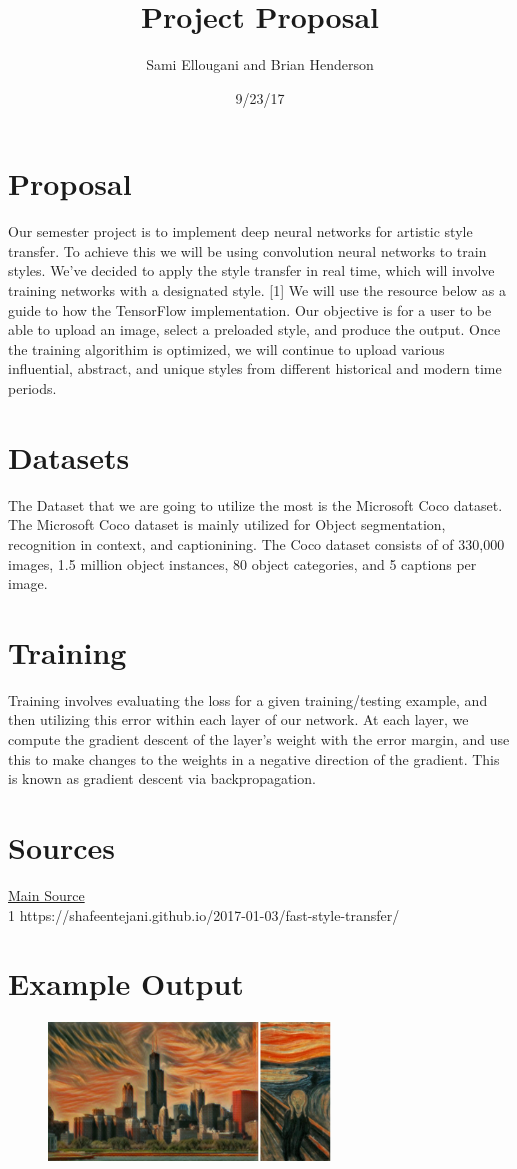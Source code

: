 \documentclass[a4paper]{article}
\title{Project Proposal}
\author{Sami Ellougani and Brian Henderson}
\date{9/23/17}
\begin{document}
\lstset{language=Python}

\maketitle

\section{Proposal}
Our semester project is to implement deep neural networks for artistic style transfer. To achieve this we will be using convolution neural networks to
train styles. We've decided to apply the style transfer in real time, which will involve training networks with a designated style. [1] We will
use the resource below as a guide to how the TensorFlow implementation. Our objective is for a user to be able to upload an image, select a preloaded style, and produce
the output. Once the training algorithim is optimized, we will continue to upload various influential, abstract, and unique styles from different historical and modern
time periods. 


\section{Datasets}
The Dataset that we are going to utilize the most is the Microsoft Coco dataset. The Microsoft Coco dataset is mainly utilized for 
Object segmentation, recognition in context, and captionining. The Coco dataset consists of of 330,000 images, 1.5 million object instances, 
80 object categories, and 5 captions per image.

\section{Training}
Training involves evaluating the loss for a given training/testing example, and then utilizing this error within each layer of our network. 
At each layer, we compute the gradient descent of the layer's weight with the error margin, and use this to make changes to the weights in a negative 
direction of the gradient. This is known as gradient descent via backpropagation.

\section{Sources}
\href{https://shafeentejani.github.io/2017-01-03/fast-style-transfer/}{Main Source} \\
	1  https://shafeentejani.github.io/2017-01-03/fast-style-transfer/

\section{Example Output}
\begin{figure}
  \includegraphics[width=75mm]{example.png}
\end{figure}
\end{document}
